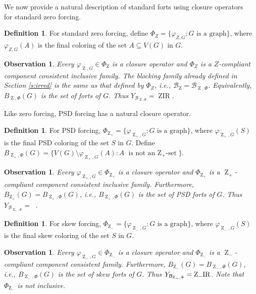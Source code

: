 \documentclass{article}
\numberwithin{figure}{section}
\numberwithin{table}{section}
\numberwithin{equation}{section}
\newtheorem{obs}[thm]{Observation}
\theoremstyle{definition}
\theoremstyle{definition}
\newtheorem{defn}[thm]{Definition}
\theoremstyle{definition}
\newcommand{\B}{\mathcal{B}}
\newcommand{\Z}{\operatorname{Z}}
\newcommand{\Zs}{\operatorname{Z}_-}
\newcommand{\Zp}{\operatorname{Z}_+}
\DeclareMathOperator{\ZIR}{ZIR}
\DeclareMathOperator{\ZpIR}{Z_+IR}
\newcommand{\ZsIR}{\Zs\!{\rm IR}}
\begin{document}
 We now provide a natural description of standard forts using closure operators for standard zero forcing. 

\begin{defn}
For standard zero forcing, define $\Phi_Z = \{\varphi_{Z,G} : G \text{ is a graph}\}$, where $\varphi_{Z,G}(A)$ is the final coloring of the set $A\subseteq V(G)$ in $G$.
\end{defn}

\begin{obs}\label{o:BZ-BphiZ}
Every $\varphi_{\Z,G} \in \Phi_{\Z}$ is a closure operator and $\Phi_Z$ is a $Z$-compliant component consistent inclusive family. The blocking family already defined in Section \ref{s:irred} is the same as that defined by $\Phi_Z$, i.e., $\B_{\Z} = \B_{\Z,\Phi}$. Equivalently, $B_{\Z,\Phi}(G)$ is the set of forts of $G$. Thus $Y_{\B_{\Z,\Phi}}=\ZIR$.
\end{obs}


Like zero forcing, PSD forcing has a natural closure operator.
\begin{defn}
For PSD forcing, $\Phi_{\Zp} = \{\varphi_{\Zp,G} : G \text{ is a graph}\}$, where $\varphi_{\Zp,G}(S)$ is the final PSD coloring of the set $S$ in $G$.  Define  $B_{\Zp,\Phi}(G) = \{ V(G) \setminus \varphi_{\Zp,G}(A) :  A \text{ is not an $\Zp$-set}\}$.
\end{defn}

\begin{obs}
    Every $\varphi_{\Zp,G} \in \Phi_{\Zp}$ is a closure operator and $\Phi_{\Zp}$ is a $\Zp$-compliant  component consistent  inclusive family. Furthermore, $B_{\Zp}(G)=B_{\Zp,\Phi}(G)$, i.e., $B_{\Zp,\Phi}(G)$ is the set of PSD forts of $G$. Thus $Y_{\B_{\Zp,\Phi}}=\ZpIR$.
\end{obs}


\begin{defn}
For skew forcing, $\Phi_{\Zs} = \{\varphi_{\Zs,G} : G \text{ is a graph}\}$, where $\varphi_{\Zs,G}(S)$ is the final skew coloring of the set $S$ in $G$.  
\end{defn}

\begin{obs}
    Every $\varphi_{\Zs,G} \in \Phi_{\Zs}$ is a closure operator and $\Phi_{\Zs}$ is a $\Zs$-compliant  component consistent family.  
     Furthermore, $B_{\Zs}(G)=B_{\Zs,\Phi}(G)$, i.e., $B_{\Zs,\Phi}(G)$ is the set of skew forts of $G$. Thus $Y_{\B_{\Zs,\Phi}}=\ZsIR$.   Note that $\Phi_{\Zs}$ is not inclusive. 
\end{obs}
\end{document}
